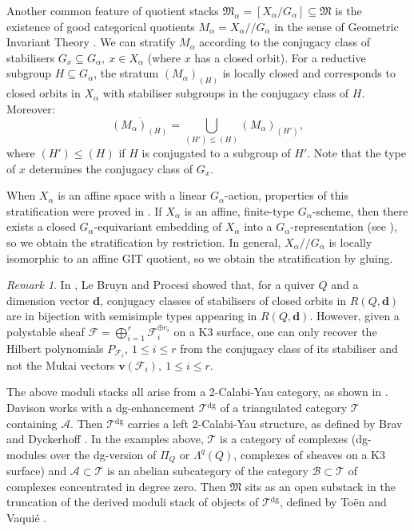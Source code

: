 \documentclass[11pt,english]{article}
\numberwithin{equation}{section}
\numberwithin{figure}{section}
\theoremstyle{definition}
\theoremstyle{plain}
\theoremstyle{remark}
\newtheorem{rmk}[df]{Remark}
\newcommand\dd{\mathbf{d}}
\newcommand\git{/\!\!/}
\begin{document}
Another common feature of quotient stacks $\mathfrak{M}_{\alpha}=[X_{\alpha}/G_{\alpha}]\subseteq\mathfrak{M}$
is the existence of good categorical quotients $M_{\alpha}=X_{\alpha}\git G_{\alpha}$
in the sense of Geometric Invariant Theory \cite[Ch. 6.]{Dol03}.
We can stratify $M_{\alpha}$ according to the conjugacy class of
stabilisers $G_{x}\subseteq G_{\alpha},\ x\in X_{\alpha}$ (where
$x$ has a closed orbit). For a reductive subgroup $H\subseteq G_{\alpha}$,
the stratum $(M_{\alpha})_{(H)}$ is locally closed and corresponds
to closed orbits in $X_{\alpha}$ with stabiliser subgroups in the
conjugacy class of $H$. Moreover:\[
\overline{(M_{\alpha})_{(H)}}=\bigcup_{(H')\leq (H)}(M_{\alpha})_{(H')},
\]where $(H')\leq(H)$ if $H$ is conjugated to a subgroup of $H'$.
Note that the type of $x$ determines the conjugacy class of $G_{x}$.

When $X_{\alpha}$ is an affine space with a linear $G_{\alpha}$-action,
properties of this stratification were proved in \cite[Lem. 5.5.]{Sch80}.
If $X_{\alpha}$ is an affine, finite-type $G_{\alpha}$-scheme, then
there exists a closed $G_{\alpha}$-equivariant embedding of $X_{\alpha}$
into a $G_{\alpha}$-representation (see \cite[Prop. 2.3.5.]{Bri17a}),
so we obtain the stratification by restriction. In general, $X_{\alpha}\git G_{\alpha}$
is locally isomorphic to an affine GIT quotient, so we obtain the
stratification by gluing.

\begin{rmk}

In \cite{LBP90}, Le Bruyn and Procesi showed that, for a quiver $Q$
and a dimension vector $\dd$, conjugacy classes of stabilisers of
closed orbits in $R(Q,\dd)$ are in bijection with semisimple types
appearing in $R(Q,\dd)$. However, given a polystable sheaf $\mathcal{F}=\bigoplus_{i=1}^{r}\mathcal{F}_{i}^{\oplus e_{i}}$
on a K3 surface, one can only recover the Hilbert polynomials $P_{\mathcal{F}_{i}},\ 1\leq i\leq r$
from the conjugacy class of its stabiliser and not the Mukai vectors
$\mathbf{v}(\mathcal{F}_{i}),\ 1\leq i\leq r$.

\end{rmk}

The above moduli stacks all arise from a 2-Calabi-Yau category, as
shown in \cite[\S7.]{Dav21a}. Davison works with a dg-enhancement
$\mathcal{T}{}^{\mathrm{dg}}$ of a triangulated category $\mathcal{T}$
containing $\mathcal{A}$. Then $\mathcal{T}{}^{\mathrm{dg}}$ carries
a left 2-Calabi-Yau structure, as defined by Brav and Dyckerhoff \cite{BD19}.
In the examples above, $\mathcal{T}$ is a category of complexes (dg-modules
over the dg-version of $\Pi_{Q}$ or $\Lambda^{q}(Q)$, complexes
of sheaves on a K3 surface) and $\mathcal{A\subset\mathcal{T}}$ is
an abelian subcategory of the category $\mathcal{B\subset\mathcal{T}}$
of complexes concentrated in degree zero. Then $\mathfrak{M}$ sits
as an open substack in the truncation of the derived moduli stack
of objects of $\mathcal{T}{}^{\mathrm{dg}}$, defined by Toën and
Vaquié \cite{TV07}.
\end{document}

